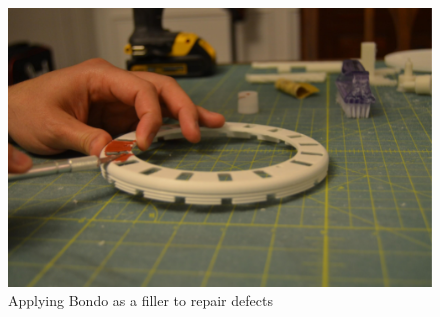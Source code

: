 \documentclass[openany]{book}
\begin{document}
\begin{figure}[!ht]
	\centering
	\includegraphics[width=.75\textwidth]{images/image13.png}
	\caption{Applying Bondo as a filler to repair defects}
	\label{fig:image13}	
\end{figure}
\end{document}
